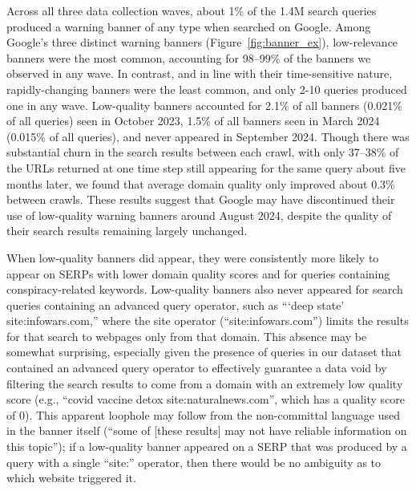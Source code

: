 Across all three data collection waves, about 1\% of the 1.4M search queries produced a warning banner of any type when searched on Google.
Among Google's three distinct warning banners (Figure~\ref{fig:banner_ex}), low-relevance banners were the most common, accounting for 98--99\% of the banners we observed in any wave.
In contrast, and in line with their time-sensitive nature, rapidly-changing banners were the least common, and only 2-10 queries produced one in any wave.
Low-quality banners accounted for 2.1\% of all banners (0.021\% of all queries) seen in October 2023, 1.5\% of all banners seen in March 2024 (0.015\% of all queries), and never appeared in September 2024. 
Though there was substantial churn in the search results between each crawl, with only 37--38\% of the URLs returned at one time step still appearing for the same query about five months later, we found that average domain quality only improved about 0.3\% between crawls.
These results suggest that Google may have discontinued their use of low-quality warning banners around August 2024, despite the quality of their search results remaining largely unchanged.

When low-quality banners did appear, they were consistently more likely to appear on SERPs with lower domain quality scores and for queries containing conspiracy-related keywords.
Low-quality banners also never appeared for search queries containing an advanced query operator, such as ```deep state' site:infowars.com,'' where the site operator (``site:infowars.com'') limits the results for that search to webpages only from that domain.
This absence may be somewhat surprising, especially given the presence of queries in our dataset that contained an advanced query operator to effectively guarantee a data void by filtering the search results to come from a domain with an extremely low quality score (e.g., ``covid vaccine detox site:naturalnews.com'', which has a quality score of 0).
This apparent loophole may follow from the non-committal language used in the banner itself (``some of [these results] may not have reliable information on this topic''); if a low-quality banner appeared on a SERP that was produced by a query with a single ``site:'' operator, then there would be no ambiguity as to which website triggered it.

